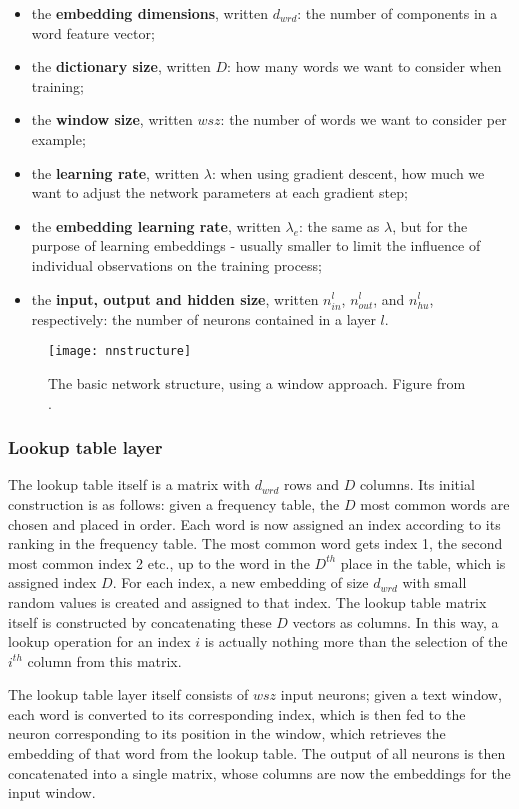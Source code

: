 \begin{itemize}
\item the \textbf{embedding dimensions}, written $d_{wrd}$: the number
of components in a word feature vector;
\item the \textbf{dictionary size}, written $D$: how many words we
want to consider when training;
\item the \textbf{window size}, written $wsz$: the number of words we
want to consider per example;
\item the \textbf{learning rate}, written $\lambda$: when using
gradient descent, how much we want to adjust the network parameters at
each gradient step;
\item the \textbf{embedding learning rate}, written $\lambda_{e}$: the
same as $\lambda$, but for the purpose of learning embeddings -
usually smaller to limit the influence of individual observations on
the training process;
\item the \textbf{input, output and hidden size}, written $n^l_{in}$,
$n^l_{out}$, and $n^l_{hu}$, respectively: the number of neurons
contained in a layer $l$.
\end{itemize}

\begin{figure}
  \texttt{[image: nnstructure]}
  \caption{The basic network structure, using a window
approach. Figure from
\cite[2499]{collobert-2011}.} \label{fig:nnstructure}
\end{figure}

\subsubsection{Lookup table layer} The lookup table itself is a matrix
with $d_{wrd}$ rows and $D$ columns. Its initial construction is as
follows: given a frequency table, the $D$ most common words are chosen
and placed in order. Each word is now assigned an index according to
its ranking in the frequency table. The most common word gets index 1,
the second most common index 2 etc., up to the word in the $D^{th}$
place in the table, which is assigned index $D$. For each index, a new
embedding of size $d_{wrd}$ with small random values is created and
assigned to that index. The lookup table matrix itself is constructed
by concatenating these $D$ vectors as columns.  In this way, a lookup
operation for an index $i$ is actually nothing more than the selection
of the $i^{th}$ column from this matrix.

The lookup table layer itself consists of $wsz$ input neurons; given a
text window, each word is converted to its corresponding index, which
is then fed to the neuron corresponding to its position in the window,
which retrieves the embedding of that word from the lookup table. The
output of all neurons is then concatenated into a single matrix, whose
columns are now the embeddings for the input window.

